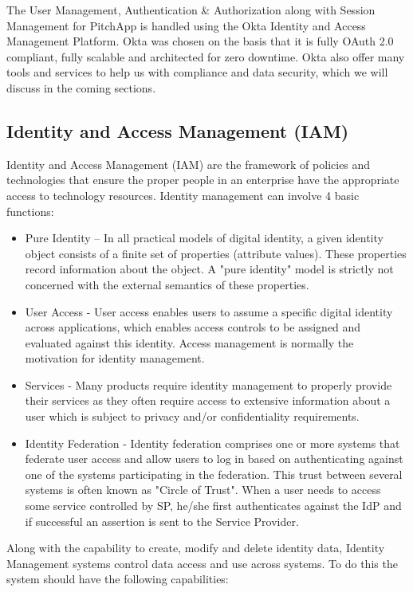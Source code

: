 The User Management, Authentication \& Authorization along with Session Management for PitchApp is handled using the Okta Identity and Access Management Platform. Okta was chosen on the basis that it is fully OAuth 2.0 compliant, fully scalable and architected for zero downtime. Okta also offer many tools and services to help us with compliance and data security, which we will discuss in the coming sections.

\subsection{Identity and Access Management (IAM)}

Identity and Access Management (IAM) are the framework of policies and technologies that ensure the proper people in an enterprise have the appropriate access to technology resources. Identity management can involve 4 basic functions:

\begin{itemize}
	\item Pure Identity – In all practical models of digital identity, a given identity object consists of a finite set of properties (attribute values). These properties record information about the object. A "pure identity" model is strictly not concerned with the external semantics of these properties.
	\item User Access - User access enables users to assume a specific digital identity across applications, which enables access controls to be assigned and evaluated against this identity. Access management is normally the motivation for identity management.
	\item Services - Many products require identity management to properly provide their services as they often require access to extensive information about a user which is subject to privacy and/or confidentiality requirements.
	\item Identity Federation - Identity federation comprises one or more systems that federate user access and allow users to log in based on authenticating against one of the systems participating in the federation. This trust between several systems is often known as "Circle of Trust". When a user needs to access some service controlled by SP, he/she first authenticates against the IdP and if successful an assertion is sent to the Service Provider.
\end{itemize}

Along with the capability to create, modify and delete identity data, Identity Management systems control data access and use across systems. To do this the system should have the following capabilities:

